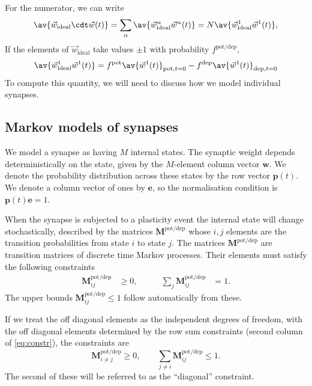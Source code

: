 \documentclass[12pt]{article}
\newcommand{\onev}{\mathbf{e}}
\newcommand{\pr}{\mathbf{p}}
\newcommand{\w}{\mathbf{w}}
\newcommand{\M}{\mathbf{M}}
\newcommand{\pot}{^{\text{pot}}}
\newcommand{\dep}{^{\text{dep}}}
\newcommand{\potdep}{^{\text{pot/dep}}}
\newcommand{\syn}{\vec{w}}
\newcommand{\synid}{\syn_\text{ideal}}
\begin{document}
For the numerator, we can write
%
\begin{equation}\label{eq:overlapex}
  \av{\syn_\text{ideal}\cdt\syn(t)} = \sum_\alpha\av{\syn^\alpha_\text{ideal}\syn^\alpha(t)}
   = N \av{\syn^1_\text{ideal}\syn^1(t)},
\end{equation}
%
If the elements of $\synid$ take values $\pm1$ with probability $f\potdep$,
%
\begin{equation}\label{eq:overlapone}
  \av{\syn^1_\text{ideal}\syn^1(t)} = f\pot \av{\syn^1(t)}_{\text{pot},t=0} - f\dep \av{\syn^1(t)}_{\text{dep},t=0}
\end{equation}
%
To compute this quantity, we will need to discuss how we model individual synapses.




\subsection{Markov models of synapses}\label{sec:markovsynapse}

We model a synapse as having $M$ internal states.
The synaptic weight depends deterministically on the state, given by the $M$-element column vector $\w$.
We denote the probability distribution across these states by the row vector $\pr(t)$.
We denote a column vector of ones by $\onev$, so the normalisation condition is $\pr(t)\onev=1$.

When the synapse is subjected to a plasticity event the internal state will change stochastically, described by the matrices $\M\potdep$ whose $i,j$ elements are the transition probabilities from state $i$ to state $j$.
The matrices $\M\potdep$ are transition matrices of discrete time Markov processes.
Their elements must satisfy the following constraints
%
\begin{equation}\label{eq:constr}
\begin{aligned}
  \M\potdep_{ij} &\geq 0, &\qquad
  \sum_j \M\potdep_{ij} &= 1.
\end{aligned}
\end{equation}
%
The upper bounds $\M\potdep_{ij} \leq 1$ follow automatically from these.

If we treat the off diagonal elements as the independent degrees of freedom, with the off diagonal elements determined by the row sum constraints (second column of \eqref{eq:constr}), the constraints are
%
\begin{equation}\label{eq:constri}
  \M\potdep_{i \neq j} \geq 0, \qquad
  \sum_{j\neq i} \M\potdep_{ij} \leq 1.
\end{equation}
%
The second of these will be referred to as the ``diagonal'' constraint.
\end{document}
